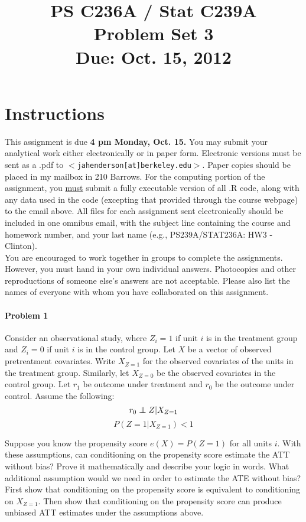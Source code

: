 \documentclass{article}
\title{PS C236A / Stat C239A \\ Problem Set 3 \\ Due: Oct. 15, 2012}
\date{}
\newcommand\independent{\protect\mathpalette{\protect\independenT}{\perp}}
\def\independenT#1#2{\mathrel{\rlap{$#1#2$}\mkern2mu{#1#2}}}
\begin{document}
\maketitle
\vspace{-4em}
\section*{Instructions}
This assignment is due {\bf 4 pm Monday, Oct. 15.}  You may submit your
analytical work either electronically or in paper form.  Electronic
versions must be sent as a .pdf to
$<$\texttt{jahenderson[at]berkeley.edu}$>$. Paper copies should be
placed in my mailbox in 210 Barrows.  For the computing portion of the
assignment, you \underline{must} submit a fully executable version of
all .R code, along with any data used in the code (excepting that
provided through the course webpage) to the email above.  All files
for each assignment sent electronically should be included in one
omnibus email, with the subject line containing the course and
homework number, and your last name (e.g., PS239A/STAT236A: HW3 - Clinton).\\


\noindent You are encouraged to work together in groups to complete
the assignments. However, you must hand in your own individual
answers. Photocopies and other reproductions of someone else’s answers
are not acceptable. Please also list the names of everyone with
whom you have collaborated on this assignment.





\paragraph{Problem 1}

Consider an observational study, where $Z_i=1$ if unit $i$ is in the
treatment group and $Z_i=0$ if unit $i$ is in the control group. Let
$X$ be a vector of observed pretreatment covariates. Write $X_{Z=1}$
for the observed covariates of the units in the treatment
group. Similarly, let $X_{Z=0}$ be the observed covariates in the
control group.  Let $r_{1}$ be outcome under treatment and $r_{0}$ be
the outcome under control.  Assume the following:
$$r_0 \independent Z|X_{Z=1}$$
$$ P(Z=1|X_{Z=1})<1$$

\noindent Suppose you know the propensity score $e(X)=P(Z=1)$ for all
units $i$.  With these assumptions, can conditioning on the propensity
score estimate the ATT without bias? Prove it mathematically and
describe your logic in words.  What additional assumption would we
need in order to estimate the ATE without bias?  First show that
conditioning on the propensity score is equivalent to conditioning on
$X_{Z=1}$. Then show that conditioning on the propensity score can
produce unbiased ATT estimates under the assumptions above.
\end{document}
